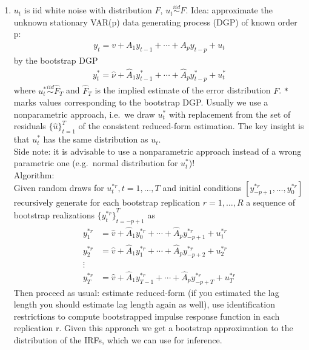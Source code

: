 \begin{enumerate}
\item \(u_{t}\) is iid white noise with distribution \(F\), \(u_{t} \overset{iid}{\sim} F\).
Idea: approximate the unknown stationary VAR{(p)} data generating process (DGP) of known order p:
\begin{align*}
y_t = v + A_1 y_{t-1} + \cdots  + A_p y_{t-p} + u_{t}
\end{align*}
by the bootstrap DGP
\begin{align*}
y_t^{\ast} = \hat{\nu} + \hat{A}_1 y_{t-1}^{\ast} + \cdots  + \hat{A}_p y_{t-p}^{\ast} + u_{t}^{\ast}
\end{align*}
where \(u_{t}^{\ast} \overset{iid}{\sim} \hat{F}_T\) and \(\hat{F}_T\) is the implied estimate of the error distribution \(F\).
\(\ast \) marks values corresponding to the bootstrap DGP\@.
Usually we use a nonparametric approach,
  i.e.\ we draw \(u_{t}^{\ast} \) with replacement from the set of residuals \( {\{\hat{u}\}}_{t=1}^T\) of the consistent reduced-form estimation.
The key insight is that \(u_{t}^{\ast} \) has the same distribution as \(u_{t}\). 
\\
Side note: it is advisable to use a nonparametric approach instead of a wrong parametric one (e.g.\ normal distribution for \(u_{t}^{\ast} \))!
\\
Algorithm:
\\
Given random draws for \(u_{t}^{\ast r}, t=1,\ldots ,T\) and initial conditions \([y_{-p+1}^{\ast r}, \ldots  ,y_0^{\ast r}]\)
  recursively generate for each bootstrap replication \(r=1,\ldots ,R\) a sequence of bootstrap realizations \( {\{y_t^{\ast r}\}}_{t=-p+1}^T\) as
\begin{align*}
y_1^{\ast r} &= \hat{v} + \hat{A}_1 y_0^{\ast r} + \cdots  + \hat{A}_p y_{-p+1}^{\ast r} + u_1^{\ast r}\\
y_2^{\ast r} &= \hat{v} + \hat{A}_1 y_1^{\ast r} + \cdots  + \hat{A}_p y_{-p+2}^{\ast r} + u_2^{\ast r}\\
\vdots &\\
y_T^{\ast r} &= \hat{v} + \hat{A}_1 y_{T-1}^{\ast r} + \cdots  + \hat{A}_p y_{-p+T}^{\ast r} + u_T^{\ast r}
\end{align*}
Then proceed as usual: estimate reduced-form (if you estimated the lag length you should estimate lag length again as well),
  use identification restrictions to compute bootstrapped impulse response function in each replication r.
Given this approach we get a bootstrap approximation to the distribution of the IRFs, which we can use for inference.


\end{enumerate}
